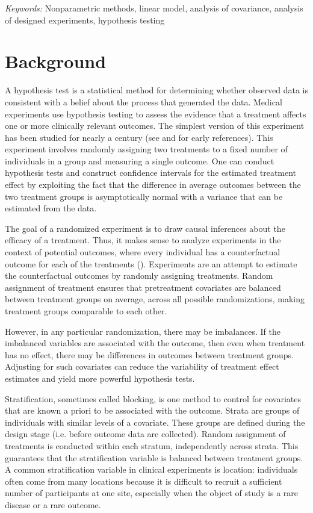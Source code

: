 \documentclass[12pt]{article}
\begin{document}
\noindent%
{\it Keywords:}  Nonparametric methods, linear model, analysis of covariance, analysis of designed experiments, hypothesis testing
\vfill

\newpage
{} %
\section{Background}
A hypothesis test is a statistical method for determining whether observed data is consistent with a belief about the process that generated the data.
Medical experiments use hypothesis testing to assess the evidence that a treatment affects one or more clinically relevant outcomes.
The simplest version of this experiment has been studied for nearly a century (see \cite{fisher_design_1935} and \cite[1990 translation]{neyman_application_1923} for early references).
This experiment involves randomly assigning two treatments to a fixed number of individuals in a group and measuring a single outcome.
One can conduct hypothesis tests and construct confidence intervals for the estimated treatment effect
by exploiting the fact that the difference in average outcomes between the two treatment groups is asymptotically normal with a variance that can be estimated from the data.

The goal of a randomized experiment is to draw causal inferences about the efficacy of a treatment.
Thus, it makes sense to analyze experiments in the context of potential outcomes, where every individual has a counterfactual outcome for each of the treatments (\cite{holland_1986_statistics}).
Experiments are an attempt to estimate the counterfactual outcomes by randomly assigning treatments.
Random assignment of treatment ensures that pretreatment covariates are balanced between treatment groups on average, across all possible randomizations, making treatment groups comparable to each other.

However, in any particular randomization, there may be imbalances.
If the imbalanced variables are associated with the outcome, then even when treatment has no effect, there may be differences in outcomes between treatment groups.
Adjusting for such covariates can reduce the variability of treatment effect estimates and yield more powerful hypothesis tests.

Stratification, sometimes called blocking, is one method to control for covariates that are known a priori to be associated with the outcome.
Strata are groups of individuals with similar levels of a covariate.
These groups are defined during the design stage (i.e. before outcome data are collected).
Random assignment of treatments is conducted within each stratum, independently across strata.
This guarantees that the stratification variable is balanced between treatment groups.
A common stratification variable in clinical experiments is location:
individuals often come from many locations because it is difficult to recruit a sufficient number of participants at one site,
especially when the object of study is a rare disease or a rare outcome.
\end{document}
